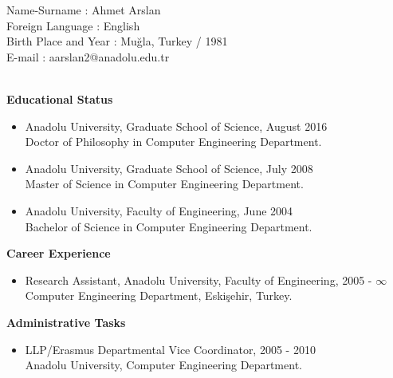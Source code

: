 %
%
%

\vspace*{0.8cm}
\noindent 
Name-Surname \phantom{iiooooo} : Ahmet Arslan\\
Foreign Language \phantom{oooo} : English\\
Birth Place and Year \phantom{o} : Mu\u{g}la, Turkey / 1981 \\
E-mail \phantom{iioooooooooooo} : aarslan2@anadolu.edu.tr

\hfil\\
\textbf{Educational Status}
\begin{itemize}
	\item Anadolu University, Graduate School of Science, \hfill August 2016 \\Doctor of Philosophy in Computer Engineering Department.
	\item Anadolu University, Graduate School of Science, \hfill July 2008 \\Master of Science in Computer Engineering Department.
	\item Anadolu University, Faculty of Engineering, \hfill June 2004 \\Bachelor of Science in Computer Engineering Department.
\end{itemize}

\noindent 
\textbf{Career Experience}
\begin{itemize}
	\item Research Assistant, Anadolu University, Faculty of Engineering, \hfill  2005 - $\infty$ \\Computer Engineering Department, Eski\c{s}ehir, Turkey.
\end{itemize}

\noindent 
\textbf{Administrative Tasks}
\begin{itemize}
	\item LLP/Erasmus Departmental Vice Coordinator, \hfill  2005 - 2010 \\ Anadolu University, Computer Engineering Department.
\end{itemize}

